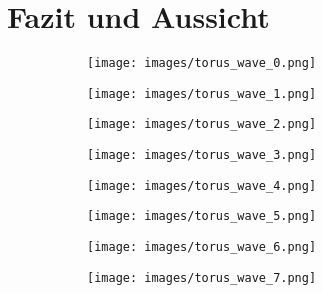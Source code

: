 \documentclass[crop=false]{standalone}
\begin{document}
  \section{Fazit und Aussicht} %
  \label{sec:conclusion}



    \begin{figure}[h]
      \center
      \begin{subfigure}[b]{0.24\textwidth}
        \center
        \texttt{[image: images/torus\_wave\_0.png]}
        \caption{}
      \end{subfigure}
      \begin{subfigure}[b]{0.24\textwidth}
        \center
        \texttt{[image: images/torus\_wave\_1.png]}
        \caption{}
      \end{subfigure}
      \begin{subfigure}[b]{0.24\textwidth}
        \center
        \texttt{[image: images/torus\_wave\_2.png]}
        \caption{}
      \end{subfigure}
      \begin{subfigure}[b]{0.24\textwidth}
        \center
        \texttt{[image: images/torus\_wave\_3.png]}
        \caption{}
      \end{subfigure}

      \begin{subfigure}[b]{0.24\textwidth}
        \center
        \texttt{[image: images/torus\_wave\_4.png]}
        \caption{}
      \end{subfigure}
      \begin{subfigure}[b]{0.24\textwidth}
        \center
        \texttt{[image: images/torus\_wave\_5.png]}
        \caption{}
      \end{subfigure}
      \begin{subfigure}[b]{0.24\textwidth}
        \center
        \texttt{[image: images/torus\_wave\_6.png]}
        \caption{}
      \end{subfigure}
      \begin{subfigure}[b]{0.24\textwidth}
        \center
        \texttt{[image: images/torus\_wave\_7.png]}
        \caption{}
      \end{subfigure}
      \caption{}
      \label{fig:torus-wave}
    \end{figure}
\end{document}
